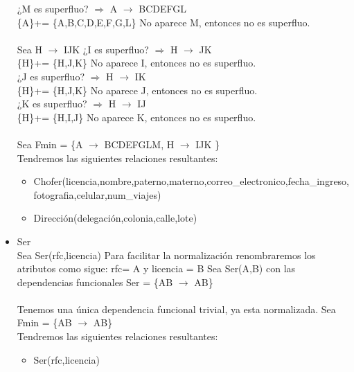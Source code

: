 \documentclass{article}
\begin{document}
\begin{itemize}
¿M es superfluo? $\Rightarrow$ A $\rightarrow$ BCDEFGL \\
\{A\}+= \{A,B,C,D,E,F,G,L\}  No aparece M, entonces no es superfluo.\\
\\
Sea H $\rightarrow$ IJK 
¿I es superfluo? $\Rightarrow$ H $\rightarrow$ JK \\
\{H\}+= \{H,J,K\} No aparece I, entonces no es superfluo.\\
¿J es superfluo? $\Rightarrow$ H $\rightarrow$ IK \\
\{H\}+= \{H,J,K\} No aparece J, entonces no es superfluo.\\
¿K es superfluo? $\Rightarrow$ H $\rightarrow$ IJ \\
\{H\}+= \{H,I,J\} No aparece K, entonces no es superfluo.\\
\\
Sea Fmin = \{A $\rightarrow$ BCDEFGLM, H $\rightarrow$ IJK  \}\\
Tendremos las siguientes relaciones resultantes:
\begin{itemize}
\item Chofer(licencia,nombre,paterno,materno,correo\_electronico,fecha\_ingreso,fotografia,celular,num\_viajes)
\item Dirección(delegación,colonia,calle,lote)
\end{itemize}

\item Ser\\
Sea Ser(rfc,licencia)
Para facilitar la normalización renombraremos los atributos como sigue:
rfc= A y licencia = B
Sea Ser(A,B) con las dependencias funcionales 
Ser = \{AB $\rightarrow$ AB\} \\
\\
Tenemos una única dependencia funcional trivial, ya esta normalizada.
Sea Fmin = \{AB $\rightarrow$ AB\} \\
Tendremos las siguientes relaciones resultantes:
\begin{itemize}
\item Ser(rfc,licencia)
\end{itemize}



\end{itemize}
\end{document}
